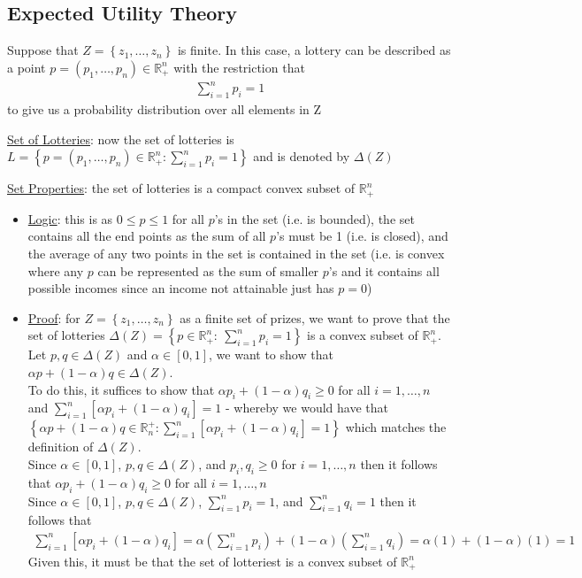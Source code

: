 \documentclass{article}
\begin{document}
\subsection{Expected Utility Theory}
Suppose that $Z = \left\{ z_{1}, \dots, z_{n} \right\}$ is finite. In this case, a lottery can be described as a point $p = (p_{1}, \dots, p_{n}) \in \mathbb{R}_{+}^{n}$ with the restriction that
\begin{gather*}
  \sum_{i=1}^{n}p_{i} = 1
\end{gather*}
to give us a probability distribution over all elements in Z
\par \vspace{0.3em}
  \underline{Set of Lotteries}: now the set of lotteries is $L = \left\{ p = (p_{1}, \dots, p_{n}) \in \mathbb{R}_{+}^{n}: \sum_{i=1}^{n} p_{i}=1 \right\}$ and is denoted by $\Delta (Z)$
  \par
  \underline{Set Properties}: the set of lotteries is a compact convex subset of $\mathbb{R}_{+}^{n}$
  \begin{itemize}
    \item \underline{Logic}: this is as $0 \leq p \leq 1$ for all $p$'s in the set (i.e. is bounded), the set contains all the end points as the sum of all $p$'s must be 1 (i.e. is closed), and the average of any two points in the set is contained in the set (i.e. is convex where any $p$ can be represented as the sum of smaller $p$'s and it contains all possible incomes since an income not attainable just has $p=0$)
    \item  \underline{Proof}: for $Z = \left\{ z_{1}, \dots, z_{n} \right\}$ as a finite set of prizes, we want to prove that the set of lotteries $\Delta (Z) = \left\{ p \in \mathbb{R}_{+}^{n}: \ \sum_{i=1}^{n} p_{i} = 1 \right\}$ is a convex subset of $\mathbb{R}_{+}^{n}$. Let $p,q \in \Delta (Z)$ and $\alpha \in [0,1]$, we want to show that $\alpha p + (1- \alpha)q \in \Delta(Z)$. \\
    To do this, it suffices to show that $\alpha p_{i} + (1-\alpha) q_{i} \geq 0$ for all $i = 1, \dots, n$ and $\sum_{i=1}^{n} [\alpha p_{i} + (1-\alpha)q_{i}] = 1$ - whereby we would have that $\left\{ \alpha p + (1-\alpha)q \in \mathbb{R}_{n}^{+}: \sum_{i=1}^{n}[\alpha p_{i} + (1- \alpha)q_{i} ] = 1 \right\}$ which matches the definition of $\Delta(Z)$. \\
    Since $\alpha \in [0,1]$, $p, q \in \Delta(Z)$, and $p_{i},q_{i} \geq 0$ for $i = 1, \dots, n$ then it follows that $\alpha p_{i} + (1-\alpha) q_{i} \geq 0$ for all $i = 1, \dots, n$ \\
    Since $\alpha \in [0,1]$, $p, q \in \Delta(Z)$, $\sum_{i=1}^{n} p_{i} = 1$, and $\sum_{i=1}^{n}q_{i} = 1$ then it follows that
    \begin{gather*}
      \sum_{i=1}^{n} [\alpha p_{i} + (1-\alpha)q_{i}] = \alpha (\sum_{i=1}^{n} p_{i}) + (1-\alpha)(\sum_{i=1}^{n} q_{i}) = \alpha (1) + (1- \alpha)(1) = 1
    \end{gather*}
    Given this, it must be that the set of lotteriest is a convex subset of $\mathbb{R}_{+}^{n}$
  \end{itemize}
  \par
\vspace{6mm}
\end{document}

